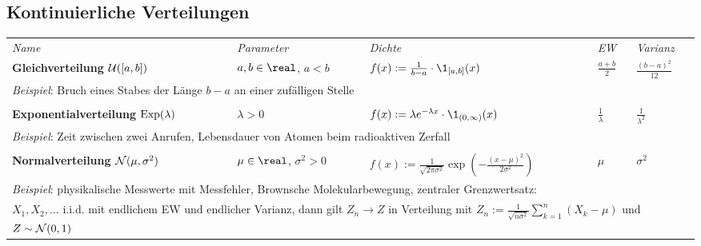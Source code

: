 \begin{landscape}
\section{%
    Kontinuierliche Verteilungen%
}

\begin{tabular}{p{85mm}p{40mm}p{65mm}p{20mm}p{27mm}}
    \toprule
    \emph{Name} & \emph{Parameter} & \emph{Dichte} & \emph{EW} & \emph{Varianz}\\

    \addlinespace[5mm]
    \midrule
    \textbf{Gleichverteilung $\mathcal{U}([a, b])$} &
    $a, b \in \real$, $a < b$ &
    $f(x) := \frac{1}{b-a} \cdot \1_{[a,b]}(x)$ &
    $\frac{a+b}{2}$ &
    $\frac{(b-a)^2}{12}$\\
    \multicolumn{5}{l}{\emph{Beispiel}:
    Bruch eines Stabes der Länge $b - a$ an einer zufälligen Stelle}\\
    \multicolumn{5}{l}{}\\

    \addlinespace[5mm]
    \midrule
    \textbf{Exponentialverteilung $\operatorname{Exp}(\lambda)$} &
    $\lambda > 0$ &
    $f(x) := \lambda e^{-\lambda x} \cdot \1_{(0,\infty)}(x)$ &
    $\frac{1}{\lambda}$ &
    $\frac{1}{\lambda^2}$\\
    \multicolumn{5}{l}{\emph{Beispiel}:
    Zeit zwischen zwei Anrufen, Lebensdauer von Atomen beim radioaktiven Zerfall}\\
    \multicolumn{5}{l}{}\\

    \addlinespace[5mm]
    \midrule
    \textbf{Normalverteilung $\mathcal{N}(\mu, \sigma^2)$} &
    $\mu \in \real$, $\sigma^2 > 0$ &
    $f(x) := \frac{1}{\sqrt{2\pi\sigma^2}} \exp(-\frac{(x-\mu)^2}{2\sigma^2})$ &
    $\mu$ &
    $\sigma^2$\\
    \multicolumn{5}{l}{\emph{Beispiel}:
    physikalische Messwerte mit Messfehler, Brownsche Molekularbewegung,
    zentraler Grenzwertsatz:}\\
    \multicolumn{5}{l}{$X_1, X_2, \dotsc$ i.i.d. mit endlichem EW und
    endlicher Varianz, dann gilt
    $Z_n \to Z$ in Verteilung mit
    $Z_n := \frac{1}{\sqrt{n\sigma^2}} \sum_{k=1}^n (X_k - \mu)$ und
    $Z \sim \mathcal{N}(0, 1)$}\\



\end{tabular}
\end{landscape}
